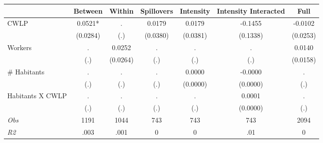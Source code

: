 \begin{tabular}{l*{6}{c}}\hline&\multicolumn{1}{c}{Between}&\multicolumn{1}{c}{Within}&\multicolumn{1}{c}{Spillovers}&\multicolumn{1}{c}{Intensity}&\multicolumn{1}{c}{Intensity Interacted}&\multicolumn{1}{c}{Full}\\ \hline 
CWLP & 0.0521* & . & 0.0179 & 0.0179 & -0.1455 & -0.0102 \\
 & (0.0284) & (.) & (0.0380) & (0.0381) & (0.1338) & (0.0253) \\
Workers & . & 0.0252 & . & . & . & 0.0140 \\
 & (.) & (0.0264) & (.) & (.) & (.) & (0.0158) \\
\# Habitants & . & . & . & 0.0000 & -0.0000 & . \\
 & (.) & (.) & (.) & (0.0000) & (0.0000) & (.) \\
Habitants X CWLP & . & . & . & . & 0.0001 & . \\
 & (.) & (.) & (.) & (.) & (0.0000) & (.) \\
\hline \textit{Obs} & 1191 & 1044 & 743 & 743 & 743 & 2094 \\ \textit{R2} & .003 & .001 & 0 & 0 & .01 & 0 \\ \hline \end{tabular}
